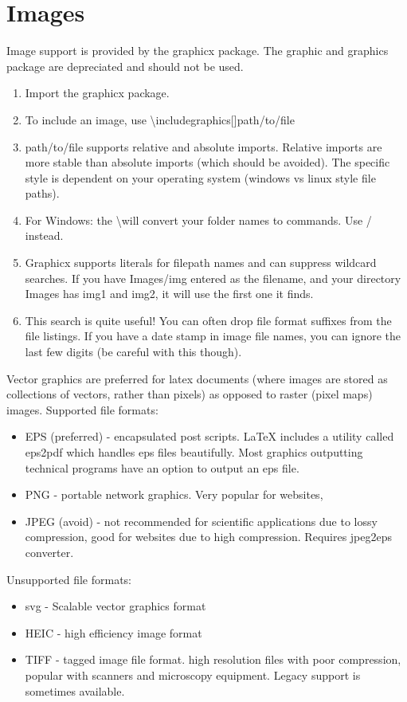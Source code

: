 \documentclass[11pt]{article}
\begin{document}
\section{Images}
Image support is provided by the graphicx package. The graphic and graphics package are depreciated and should not be used. 
\begin{enumerate}
	\item Import the graphicx package.
	\item To include an image, use \textbackslash includegraphics[]{path/to/file}
	\item path/to/file supports relative and absolute imports. Relative imports are more stable than absolute imports (which should be avoided). The specific style is dependent on your operating system (windows vs linux style file paths). 
	\item For Windows: the \textbackslash will convert your folder names to commands. Use / instead.
	\item Graphicx supports literals for filepath names and can suppress wildcard searches. If you have Images/img entered as the filename, and your directory Images has img1 and img2, it will use the first one it finds. 
	\item This search is quite useful! You can often drop file format suffixes from the file listings. If you have a date stamp in image file names, you can ignore the last few digits (be careful with this though). 
\end{enumerate}
Vector graphics are preferred for latex documents (where images are stored as collections of vectors, rather than pixels) as opposed to raster (pixel maps) images. 
Supported file formats:
\begin{itemize}
	\item EPS (preferred) - encapsulated post scripts. LaTeX includes a utility called eps2pdf which handles eps files beautifully. Most graphics outputting technical programs have an option to output an eps file. 
	\item PNG - portable network graphics. Very popular for websites, 
	\item JPEG (avoid) - not recommended for scientific applications due to lossy compression, good for websites due to high compression. Requires jpeg2eps converter. 
\end{itemize}
Unsupported file formats:
\begin{itemize}
	\item svg - Scalable vector graphics format
	\item HEIC - high efficiency image format
	\item TIFF - tagged image file format. high resolution files with poor compression, popular with scanners and microscopy equipment. Legacy support is sometimes available. 
\end{itemize}
\end{document}
